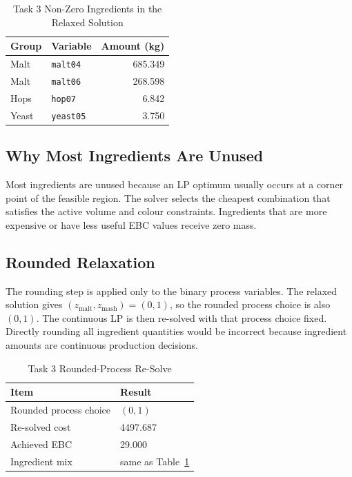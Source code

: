 \begin{table}[!t]
\renewcommand{\arraystretch}{1.15}
\caption{Task 3 Non-Zero Ingredients in the Relaxed Solution}
\label{tab:task33-relaxation-ingredients}
\centering
\small
\begin{tabular}{@{}llr@{}}
\toprule
Group & Variable & Amount (kg) \\
\midrule
Malt & \texttt{malt04} & 685.349 \\
Malt & \texttt{malt06} & 268.598 \\
Hops & \texttt{hop07} & 6.842 \\
Yeast & \texttt{yeast05} & 3.750 \\
\bottomrule
\end{tabular}
\end{table}

\subsection{Why Most Ingredients Are Unused}
\label{sec:task3-unused}
Most ingredients are unused because an LP optimum usually occurs at a corner point of the feasible region. The solver selects the cheapest combination that satisfies the active volume and colour constraints. Ingredients that are more expensive or have less useful EBC values receive zero mass.

\subsection{Rounded Relaxation}
\label{sec:task3-rounded}
The rounding step is applied only to the binary process variables. The relaxed solution gives $(z_{\mathrm{malt}},z_{\mathrm{mash}})=(0,1)$, so the rounded process choice is also $(0,1)$. The continuous LP is then re-solved with that process choice fixed. Directly rounding all ingredient quantities would be incorrect because ingredient amounts are continuous production decisions.

\begin{table}[!t]
\renewcommand{\arraystretch}{1.15}
\caption{Task 3 Rounded-Process Re-Solve}
\label{tab:task33-rounded}
\centering
\small
\begin{tabular}{@{}ll@{}}
\toprule
Item & Result \\
\midrule
Rounded process choice & $(0,1)$ \\
Re-solved cost & 4497.687 \\
Achieved EBC & 29.000 \\
Ingredient mix & same as Table~\ref{tab:task33-relaxation-ingredients} \\
\bottomrule
\end{tabular}
\end{table}

